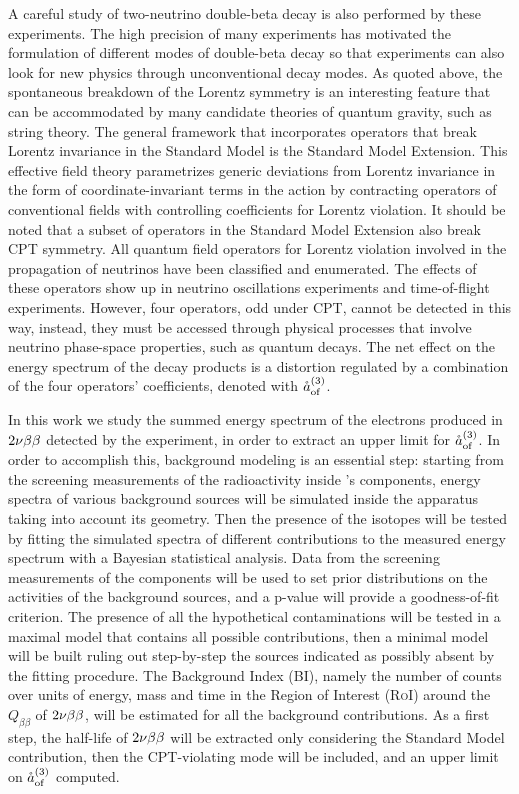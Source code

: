 	A careful study of two-neutrino double-beta decay is also performed by these experiments. The high precision of many experiments has motivated the formulation of different modes of double-beta decay so that experiments can also look for new physics through unconventional decay modes. As quoted above, the spontaneous breakdown of the Lorentz symmetry is an interesting feature that can be accommodated by many candidate theories of quantum gravity, such as string theory. The general framework that incorporates operators that break Lorentz invariance in the Standard Model is the Standard Model Extension. This effective field theory parametrizes generic deviations from Lorentz invariance in the form of coordinate-invariant terms in the action by contracting operators of conventional fields with controlling coefficients for Lorentz violation. It should be noted that a subset of operators in the Standard Model Extension also break CPT symmetry. All quantum field operators for Lorentz violation involved in the propagation of neutrinos have been classified and enumerated. The effects of these operators show up in neutrino oscillations experiments and time-of-flight experiments. However, four operators, odd under CPT, cannot be detected in this way, instead, they must be accessed through physical processes that involve neutrino phase-space properties, such as quantum decays. The net effect on the energy spectrum of the decay products is a distortion regulated by a combination of the four operators' coefficients, denoted with $\mathring{a}_\text{of}^{(3)}$.

	In this work we study the summed energy spectrum of the electrons produced in $2\nu\beta\beta$ detected by the {\gerda} experiment, in order to extract an upper limit for $\mathring{a}_\text{of}^{(3)}$. In order to accomplish this, background modeling is an essential step: starting from the screening measurements of the radioactivity inside {\gerda}’s components, energy spectra of various background sources will be simulated inside the apparatus taking into account its geometry. Then the presence of the isotopes will be tested by fitting the simulated spectra of different contributions to the measured energy spectrum with a Bayesian statistical analysis. Data from the screening measurements of the {\gerda} components will be used to set prior distributions on the activities of the background sources, and a p-value will provide a goodness-of-fit criterion. The presence of all the hypothetical contaminations will be tested in a maximal model that contains all possible contributions, then a minimal model will be built ruling out step-by-step the sources indicated as possibly absent by the fitting procedure. The Background Index (BI), namely the number of counts over units of energy, mass and time in the Region of Interest (\textsc{RoI}) around the $Q_{\beta\beta}$ of $2\nu\beta\beta$, will be estimated for all the background contributions. As a first step, the half-life of $2\nu\beta\beta$ will be extracted only considering the Standard Model contribution, then the CPT-violating mode will be included, and an upper limit on $\mathring{a}_\text{of}^{(3)}$ computed.

